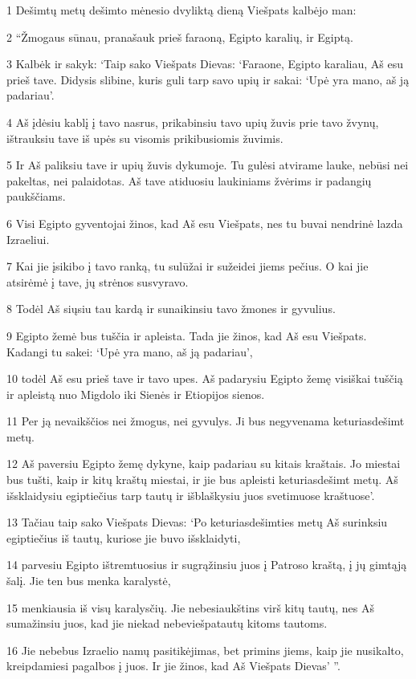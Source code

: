 \par 1 Dešimtų metų dešimto mėnesio dvyliktą dieną Viešpats kalbėjo man: 
\par 2 “Žmogaus sūnau, pranašauk prieš faraoną, Egipto karalių, ir Egiptą. 
\par 3 Kalbėk ir sakyk: ‘Taip sako Viešpats Dievas: ‘Faraone, Egipto karaliau, Aš esu prieš tave. Didysis slibine, kuris guli tarp savo upių ir sakai: ‘Upė yra mano, aš ją padariau’. 
\par 4 Aš įdėsiu kablį į tavo nasrus, prikabinsiu tavo upių žuvis prie tavo žvynų, ištrauksiu tave iš upės su visomis prikibusiomis žuvimis. 
\par 5 Ir Aš paliksiu tave ir upių žuvis dykumoje. Tu gulėsi atvirame lauke, nebūsi nei pakeltas, nei palaidotas. Aš tave atiduosiu laukiniams žvėrims ir padangių paukščiams. 
\par 6 Visi Egipto gyventojai žinos, kad Aš esu Viešpats, nes tu buvai nendrinė lazda Izraeliui. 
\par 7 Kai jie įsikibo į tavo ranką, tu sulūžai ir sužeidei jiems pečius. O kai jie atsirėmė į tave, jų strėnos susvyravo. 
\par 8 Todėl Aš siųsiu tau kardą ir sunaikinsiu tavo žmones ir gyvulius. 
\par 9 Egipto žemė bus tuščia ir apleista. Tada jie žinos, kad Aš esu Viešpats. Kadangi tu sakei: ‘Upė yra mano, aš ją padariau’, 
\par 10 todėl Aš esu prieš tave ir tavo upes. Aš padarysiu Egipto žemę visiškai tuščią ir apleistą nuo Migdolo iki Sienės ir Etiopijos sienos. 
\par 11 Per ją nevaikščios nei žmogus, nei gyvulys. Ji bus negyvenama keturiasdešimt metų. 
\par 12 Aš paversiu Egipto žemę dykyne, kaip padariau su kitais kraštais. Jo miestai bus tušti, kaip ir kitų kraštų miestai, ir jie bus apleisti keturiasdešimt metų. Aš išsklaidysiu egiptiečius tarp tautų ir išblaškysiu juos svetimuose kraštuose’. 
\par 13 Tačiau taip sako Viešpats Dievas: ‘Po keturiasdešimties metų Aš surinksiu egiptiečius iš tautų, kuriose jie buvo išsklaidyti, 
\par 14 parvesiu Egipto ištremtuosius ir sugrąžinsiu juos į Patroso kraštą, į jų gimtąją šalį. Jie ten bus menka karalystė, 
\par 15 menkiausia iš visų karalysčių. Jie nebesiaukštins virš kitų tautų, nes Aš sumažinsiu juos, kad jie niekad nebeviešpatautų kitoms tautoms. 
\par 16 Jie nebebus Izraelio namų pasitikėjimas, bet primins jiems, kaip jie nusikalto, kreipdamiesi pagalbos į juos. Ir jie žinos, kad Aš­ Viešpats Dievas’ ”. 
